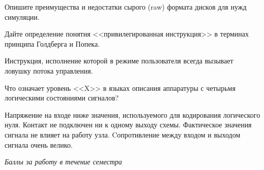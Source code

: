 \documentclass[a4paper, addpoints]{exam}
\begin{document}
\begin{questions}
\question[2] Опишите преимущества и недостатки сырого (raw) формата дисков для нужд симуляции.
\begin{solution}[2cm]
\end{solution}

\question[2] Дайте определение понятия <<привилегированная инструкция>> в терминах принципа Голдберга и Попека.
\begin{solution}[2cm]
Инструкция, исполнение которой в режиме пользователя всегда вызывает ловушку потока управления.
\end{solution}

\question[1] Что означает уровень <<X>> в языках описания аппаратуры с четырьмя логическими состояниями сигналов?
\begin{choices}
	\choice Напряжение на входе ниже значения, используемого для кодирования логического нуля.
    \choice Контакт не подключен ни к одному выходу схемы.
    \correctchoice Фактическое значения сигнала не влияет на работу узла.
	\choice Cопротивление между входом и выходом сигнала очень велико.
\end{choices}

\bonusquestion \textit{Баллы за работу в течение семестра}

\newpage
\phantom{Blank page}

\end{questions}
\end{document}
